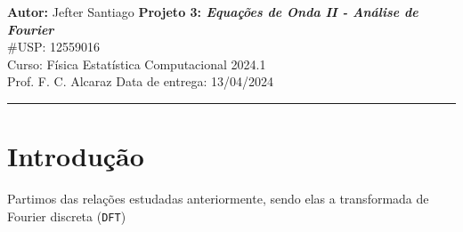 \documentclass[a4paper, 11pt]{article}
\begin{document}
\noindent
\large\textbf{Autor:} Jefter Santiago \hfill \textbf{Projeto 3: {\color{blue}\emph{Equações de Onda
      II - Análise de Fourier}}}   \\
\#USP: 12559016 \\
\normalsize Curso: Física Estatística Computacional \hfill 2024.1 \\
Prof. F. C. Alcaraz \hfill Data de entrega: 13/04/2024\\
\noindent\rule{7in}{2.8pt}

\section{Introdução}


Partimos das relações estudadas anteriormente, sendo elas a transformada de Fourier discreta (\verb|DFT|)
\end{document}
